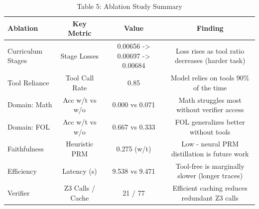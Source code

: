 \begin{table}[htbp]
  \centering
  \caption{Table 5: Ablation Study Summary}
  \begin{tabular}{lccc}
    \toprule
    \textbf{Ablation} & \textbf{Key Metric} & \textbf{Value} & \textbf{Finding} \\
    \midrule
    Curriculum Stages & Stage Losses & 0.00656 -> 0.00697 -> 0.00684 & Loss rises as tool ratio decreases (harder task) \\
    Tool Reliance & Tool Call Rate & 0.85 & Model relies on tools 90\% of the time \\
    Domain: Math & Acc w/t vs w/o & 0.000 vs 0.071 & Math struggles most without verifier access \\
    Domain: FOL & Acc w/t vs w/o & 0.667 vs 0.333 & FOL generalizes better without tools \\
    Faithfulness & Heuristic PRM & 0.275 (w/t) & Low - neural PRM distillation is future work \\
    Efficiency & Latency (s) & 9.538 vs 9.471 & Tool-free is marginally slower (longer traces) \\
    Verifier & Z3 Calls / Cache & 21 / 77 & Efficient caching reduces redundant Z3 calls \\
    \bottomrule
  \end{tabular}
\end{table}